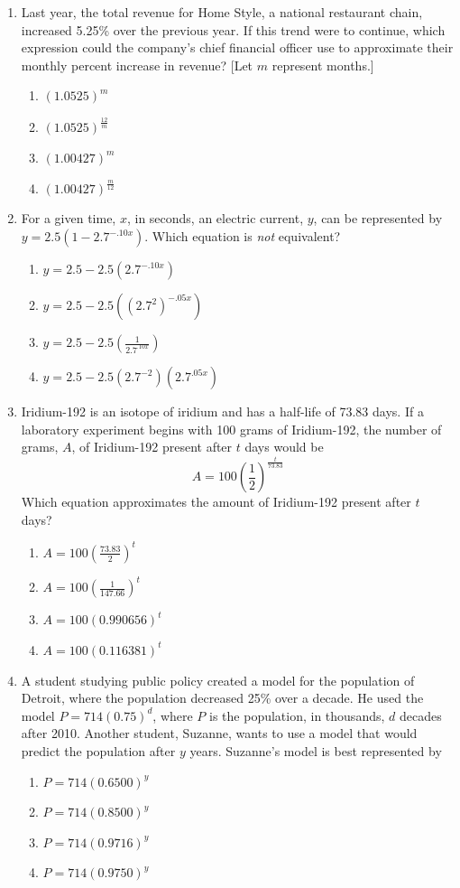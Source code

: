 \documentclass[12pt, oneside]{article}
\begin{document}
\begin{enumerate}
\item Last year, the total revenue for Home Style, a national restaurant chain, increased 5.25\% over the previous year. If this trend were to continue, which expression could the company’s chief financial officer use to approximate their monthly percent increase in revenue? [Let $m$ represent months.]
\begin{enumerate}
    \item $(1.0525)^m$
    \item $\displaystyle (1.0525)^{\frac{12}{m}}$
    \item $(1.00427)^m$
    \item $\displaystyle (1.00427)^{\frac{m}{12}}$
\end{enumerate} %

\item For a given time, $x$, in seconds, an electric current, $y$, can be represented by $y = 2.5(1 - 2.7^{-.10x})$. Which equation is \emph{not} equivalent?
\begin{enumerate}
    \item $y = 2.5 - 2.5 (2.7^{-.10x})$
    \item $y = 2.5 - 2.5 ((2.7^2)^{-.05x})$
    \item $\displaystyle y = 2.5 - 2.5 \left( \frac{1}{2.7^{.10x}} \right)$
    \item $y = 2.5 - 2.5 (2.7^{-2})(2.7^{.05x})$
\end{enumerate}

\item Iridium-192 is an isotope of iridium and has a half-life of 73.83 days. If a laboratory experiment begins with 100 grams of Iridium-192, the number of grams, $A$, of Iridium-192 present after $t$ days would be 
\[A=100 \left( \frac{1}{2} \right)^\frac{t}{73.83}\]
Which equation approximates the amount of Iridium-192 present after $t$ days?
\begin{enumerate}
    \item $\displaystyle A=100 \left( \frac{73.83}{2} \right)^t$
    \item $\displaystyle A=100 \left( \frac{1}{147.66} \right)^t$
    \item $A=100  (0.990656)^t$
    \item $A=100 (0.116381)^t$
\end{enumerate}

\item A student studying public policy created a model for the population of Detroit, where the population decreased 25\% over a decade. He used the model $P =714(0.75)^d$, where $P$ is the population, in thousands, $d$ decades after 2010. Another student, Suzanne, wants to use a model that would predict the population after $y$ years. Suzanne’s model is best represented by
\begin{enumerate}
    \item $P=714(0.6500)^y$
    \item $P=714(0.8500)^y$
    \item $P=714(0.9716)^y$
    \item $P=714(0.9750)^y$
\end{enumerate}  %



\end{enumerate}
\end{document}

